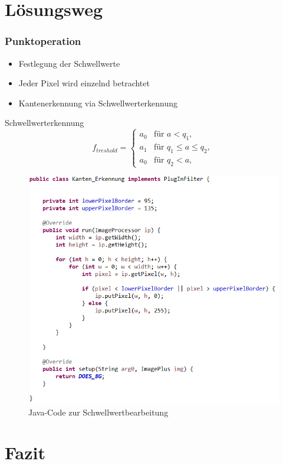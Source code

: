 \documentclass[12pt]{beamer}
\begin{document}
\section{Lösungsweg}

\begin{frame}
\frametitle{Punktoperation}
\begin{itemize}
	\item Festlegung der Schwellwerte
	\item Jeder Pixel wird einzelnd betrachtet
	\item Kantenerkennung via Schwellwerterkennung
\end{itemize}
\begin{block}{Schwellwerterkennung}	
	\begin{equation*}
		f_{treshold}=
		\begin{cases}
			a_0   			& \text{für } a < q_1,\\
			a_1        		& \text{für } q_1 \leq a \leq q_2, \\
			a_0        		& \text{für } q_2 < a,
		\end{cases}
	\end{equation*}
\end{block}
\end{frame}

\begin{frame}
	\begin{figure}[H]
		\centering
		\includegraphics[width=.7\linewidth]{Code.png}
		\caption{Java-Code zur Schwellwertbearbeitung}
	\end{figure}
\end{frame}

\section{Fazit}
\end{document}
